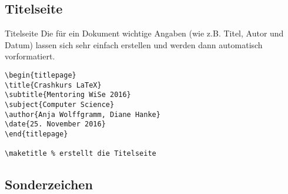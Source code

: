\subsection{Titelseite}
\begin{frame}[fragile]{Titelseite}
Die für ein Dokument wichtige Angaben (wie z.B. Titel, Autor und Datum) lassen sich sehr einfach erstellen und werden dann automatisch vorformatiert.
\begin{lstlisting}[style=tex]
\begin{titlepage}
\title{Crashkurs LaTeX}
\subtitle{Mentoring WiSe 2016}
\subject{Computer Science}
\author{Anja Wolffgramm, Diane Hanke}
\date{25. November 2016}
\end{titlepage}

\maketitle % erstellt die Titelseite
\end{lstlisting}


% 
% 

% 

% 
\end{frame}

\subsection{Sonderzeichen}

